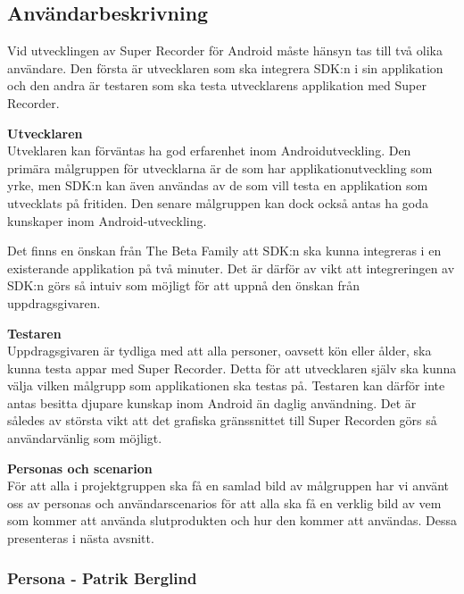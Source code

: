 \subsection{Användarbeskrivning}

Vid utvecklingen av Super Recorder för Android måste hänsyn tas till två olika användare. Den första är utvecklaren som ska integrera SDK:n i sin applikation och den andra är testaren som ska testa utvecklarens applikation med Super Recorder.

\textbf{Utvecklaren} \\
Utveklaren kan förväntas ha god erfarenhet inom Androidutveckling. Den primära målgruppen för utvecklarna är de som har applikationutveckling som yrke, men SDK:n kan även användas av de som vill testa en applikation som utvecklats på fritiden. Den senare målgruppen kan dock också antas ha goda kunskaper inom Android-utveckling. 

Det finns en önskan från The Beta Family att SDK:n ska kunna integreras i en existerande applikation på två minuter. Det är därför av vikt att integreringen av SDK:n görs så intuiv som möjligt för att uppnå den önskan från uppdragsgivaren.

\textbf{Testaren} \\
Uppdragsgivaren är tydliga med att alla personer, oavsett kön eller ålder, ska kunna testa appar med Super Recorder. Detta för att utvecklaren själv ska kunna välja vilken målgrupp som applikationen ska testas på. Testaren kan därför inte antas besitta djupare kunskap inom Android än daglig användning. Det är således av största vikt att det grafiska gränssnittet till Super Recorden görs så användarvänlig som möjligt.

\textbf{Personas och scenarion} \\
För att alla i projektgruppen ska få en samlad bild av målgruppen har vi använt oss av personas och användarscenarios för att alla ska få en verklig bild av vem som kommer att använda slutprodukten och hur den kommer att användas. Dessa presenteras i nästa avsnitt.
\newpage	
\subsubsection{Persona - Patrik Berglind}

\vspace{40px}

